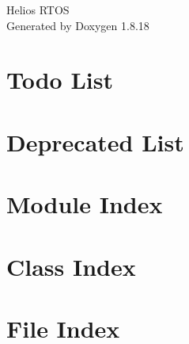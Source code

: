 \let\mypdfximage\pdfximage\def\pdfximage{\immediate\mypdfximage}\documentclass[twoside]{book}
\newcommand{\+}{\discretionary{\mbox{\scriptsize$\hookleftarrow$}}{}{}}
\newcommand{\clearemptydoublepage}{%
  \newpage{\pagestyle{empty}\cleardoublepage}%
}
\begin{document}
\hypersetup{pageanchor=false,
             bookmarksnumbered=true,
             pdfencoding=unicode
            }
\begin{titlepage}
\vspace*{7cm}
\begin{center}%
{\Large Helios R\+T\+OS }\\
\vspace*{1cm}
{\large Generated by Doxygen 1.8.18}\\
\end{center}
\end{titlepage}
\clearemptydoublepage
{}
\tableofcontents
\clearemptydoublepage
{}
\hypersetup{pageanchor=true}

\chapter{Todo List}
\label{todo}

\chapter{Deprecated List}
\label{deprecated}

\chapter{Module Index}

\chapter{Class Index}

\chapter{File Index}

\end{document}
